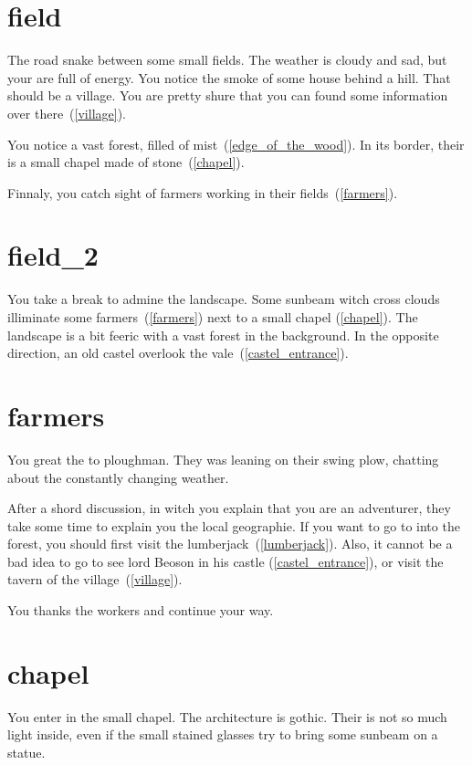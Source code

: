 \section{field}

The road snake between some small fields. The weather is cloudy and sad, but
your are full of energy. You notice the smoke of some house behind a hill. That
should be a village. You are pretty shure that you can found some information
over there~(\ref{village}).

You notice a vast forest, filled of mist~(\ref{edge_of_the_wood}). In its
border, their is a small chapel made of stone~(\ref{chapel}).

Finnaly, you catch sight of farmers working in their fields~(\ref{farmers}).

\section{field_2}

You take a break to admine the landscape. Some sunbeam witch cross clouds
illiminate some farmers~(\ref{farmers}) next to a small chapel (\ref{chapel}).
The landscape is a bit feeric with a vast forest in the background. In the
opposite direction, an old castel overlook the vale~(\ref{castel_entrance}).

\section{farmers}

You great the to ploughman. They was leaning on their swing plow, chatting about
the constantly changing weather.

After a shord discussion, in witch you explain that you are an adventurer, they
take some time to explain you the local geographie. If you want to go to into
the forest, you should first visit the lumberjack~(\ref{lumberjack}). Also, it
cannot be a bad idea to go to see lord Beoson in his castle
(\ref{castel_entrance}), or visit the tavern of the village~(\ref{village}).

You thanks the workers and continue your way.

\section{chapel}

You enter in the small chapel. The architecture is gothic. Their is not so much
light inside, even if the small stained glasses try to bring some sunbeam on a
statue.

